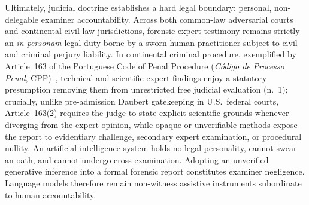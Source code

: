 Ultimately, judicial doctrine establishes a hard legal boundary: personal, non-delegable examiner accountability. Across both common-law adversarial courts and continental civil-law jurisdictions, forensic expert testimony remains strictly an \textit{in personam} legal duty borne by a sworn human practitioner subject to civil and criminal perjury liability. In continental criminal procedure, exemplified by Article~163 of the Portuguese Code of Penal Procedure (\textit{C{\'o}digo de Processo Penal}, CPP)~\cite{portugal_cpp}, technical and scientific expert findings enjoy a statutory presumption removing them from unrestricted free judicial evaluation (n.{\textordmasculine}~1); crucially, unlike pre-admission Daubert gatekeeping in U.S.\ federal courts, Article~163(2) requires the judge to state explicit scientific grounds whenever diverging from the expert opinion, while opaque or unverifiable methods expose the report to evidentiary challenge, secondary expert examination, or procedural nullity. An artificial intelligence system holds no legal personality, cannot swear an oath, and cannot undergo cross-examination. Adopting an unverified generative inference into a formal forensic report constitutes examiner negligence. Language models therefore remain non-witness assistive instruments subordinate to human accountability.

